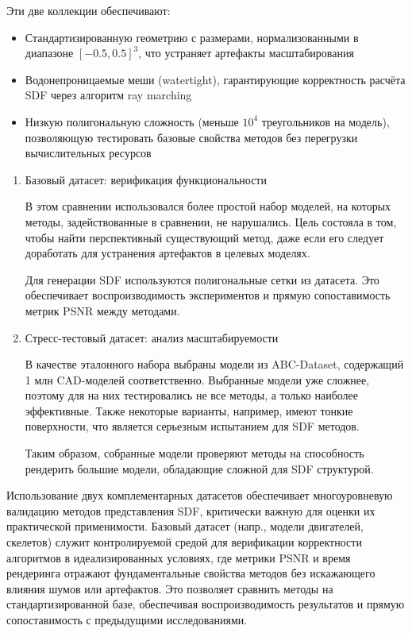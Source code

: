 \documentclass[a4paper,hidelinks,12pt]{article}
\begin{document}
Эти  две коллекции обеспечивают:

\begin{itemize}
	\item Стандартизированную геометрию с размерами, нормализованными в диапазоне $[-0.5, 0.5]^3$, что устраняет артефакты масштабирования
	\item Водонепроницаемые меши (watertight), гарантирующие корректность расчёта SDF через алгоритм ray marching
	\item Низкую полигональную сложность (меньше $10^4$ треугольников на модель), позволяющую тестировать базовые свойства методов без перегрузки вычислительных ресурсов
\end{itemize}

\begin{enumerate}
	\item Базовый датасет: верификация функциональности
	\par
	В этом сравнении использовался более простой набор моделей, на которых методы, задействованные в сравнении, 
	не нарушались. Цель состояла в том, чтобы найти перспективный существующий метод, даже если его следует доработать для 
	устранения артефактов в целевых моделях.

	Для генерации SDF используются полигональные сетки из датасета. Это обеспечивает воспроизводимость экспериментов и 
	прямую сопоставимость метрик PSNR между методами.

	\item Стресс-тестовый датасет: анализ масштабируемости
	\par
	В качестве эталонного набора выбраны модели из ABC-Dataset, содержащий 1 млн CAD-моделей соответственно. Выбранные модели уже сложнее, поэтому 
	для на них тестировались не все методы, а только наиболее эффективные. Также некоторые варианты, например, имеют тонкие поверхности, что является серьезным 
	испытанием для SDF методов. 

	Таким образом, собранные модели проверяют методы на способность рендерить большие модели, обладающие сложной для SDF структурой.

\end{enumerate}

Использование двух комплементарных датасетов обеспечивает многоуровневую валидацию методов представления SDF, критически важную 
для оценки их практической применимости. Базовый датасет (напр., модели двигателей, скелетов) служит контролируемой средой 
для верификации корректности алгоритмов в идеализированных условиях, где метрики PSNR и время рендеринга отражают фундаментальные 
свойства методов без искажающего влияния шумов или артефактов. Это позволяет сравнить методы на стандартизированной базе, 
обеспечивая воспроизводимость результатов и прямую сопоставимость с предыдущими исследованиями.
\end{document}
